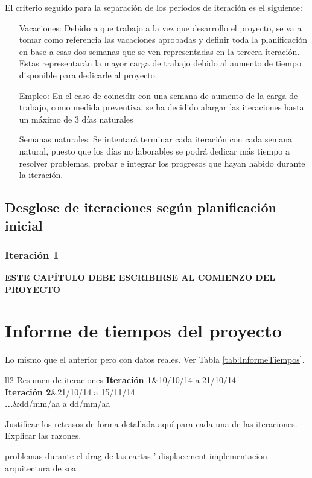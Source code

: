 El criterio seguido para la separación de los periodos de iteración es el siguiente:
\begin{itemize}
	\item [Vacaciones:] Debido a que trabajo a la vez que desarrollo el proyecto, se va a tomar como referencia las vacaciones aprobadas y definir toda la planificación en base a esas dos semanas que se ven representadas en la tercera iteración. Estas representarán la mayor carga de trabajo debido al aumento de tiempo disponible para dedicarle al proyecto.
	\item[Empleo:] En el caso de coincidir con una semana de aumento de la carga de trabajo, como medida preventiva, se ha decidido alargar las iteraciones hasta un máximo de 3 días naturales 
	\item [Semanas naturales:] Se intentará terminar cada iteración con cada semana natural, puesto que los días no laborables se podrá dedicar más tiempo a resolver problemas, probar e integrar los progresos que hayan habido durante la iteración.
\end{itemize}

\subsection{Desglose de iteraciones según planificación inicial}

\subsubsection{Iteración 1}
\textbf{ESTE CAPÍTULO DEBE ESCRIBIRSE AL COMIENZO DEL PROYECTO}

\section{Informe de tiempos del proyecto}

Lo mismo que el anterior pero con datos reales. Ver Tabla \ref{tab:InformeTiempos}.

\begin{table*}[htb]
	\centering
	\begin{coolTable}{ll}{2}
{Resumen de iteraciones}
	\textbf{Iteración 1}&10/10/14 a 21/10/14\\
	\textbf{Iteración 2}&21/10/14 a 15/11/14\\
	\textbf{...}&dd/mm/aa a dd/mm/aa\\
	\end{coolTable}
	\caption{Planificación temporal de iteraciones\label{tab:InformeTiempos}}
\end{table*}

Justificar los retrasos de forma detallada aquí para cada una de las iteraciones. Explicar las razones.

problemas durante el drag de las cartas ' displacement
implementacion arquitectura de soa